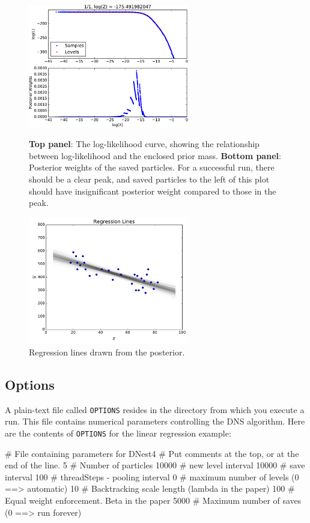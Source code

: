 \documentclass[article]{jss}
\begin{document}
\begin{figure}[ht!]
\begin{minipage}{7.5cm}
\includegraphics[width=7cm]{figures/fig3.pdf}
\caption{{\bf Top panel}: The log-likelihood curve, showing the relationship
between log-likelihood and the enclosed prior mass.
{\bf Bottom panel}: Posterior weights of the saved particles.
For a successful run, there should be a clear peak, and saved particles
to the left of this plot should have insignificant posterior weight compared
to those in the peak.
\label{fig:fig3}}
\end{minipage}\hspace{0.5cm}
\begin{minipage}{7.5cm}
\includegraphics[width=7cm]{figures/regression_lines.pdf}
\caption{Regression lines drawn from the posterior.
\label{fig:regression_lines}}
\end{minipage}
\end{figure}

\subsection{Options}\label{sec:options}
A plain-text file called {\tt OPTIONS} resides in the directory from which you
execute a run. This file contains numerical parameters controlling the
DNS algorithm. Here are the contents of {\tt OPTIONS} for the linear
regression example:

\begin{CodeChunk}
\begin{CodeInput}
# File containing parameters for DNest4
# Put comments at the top, or at the end of the line.
5       # Number of particles
10000   # new level interval
10000   # save interval
100     # threadSteps - pooling interval
0       # maximum number of levels (0 ==> automatic)
10      # Backtracking scale length (lambda in the paper)
100     # Equal weight enforcement. Beta in the paper
5000    # Maximum number of saves (0 ==> run forever)
\end{CodeInput}
\end{CodeChunk}
\end{document}
